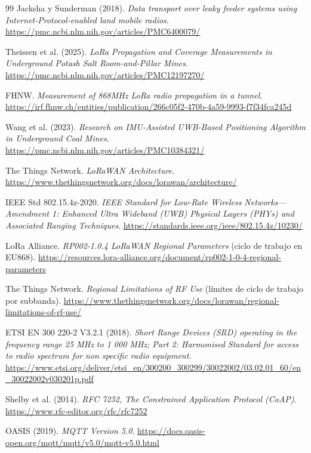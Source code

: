 \documentclass[11pt,a4paper]{article}
\begin{document}
\begin{thebibliography}{99}
     Jacksha y Sunderman (2018). \emph{Data transport over leaky feeder systems using Internet-Protocol-enabled land mobile radios}. \url{https://pmc.ncbi.nlm.nih.gov/articles/PMC6400079/}

     Theissen et al. (2025). \emph{LoRa Propagation and Coverage Measurements in Underground Potash Salt Room-and-Pillar Mines}. \url{https://pmc.ncbi.nlm.nih.gov/articles/PMC12197270/}

     FHNW. \emph{Measurement of 868MHz LoRa radio propagation in a tunnel}. \url{https://irf.fhnw.ch/entities/publication/266c05f2-470b-4a59-9993-f7f34fca245d}

     Wang et al. (2023). \emph{Research on IMU-Assisted UWB-Based Positioning Algorithm in Underground Coal Mines}. \url{https://pmc.ncbi.nlm.nih.gov/articles/PMC10384321/}

     The Things Network. \emph{LoRaWAN Architecture}. \url{https://www.thethingsnetwork.org/docs/lorawan/architecture/}

     IEEE Std 802.15.4z-2020. \emph{IEEE Standard for Low-Rate Wireless Networks---Amendment 1: Enhanced Ultra Wideband (UWB) Physical Layers (PHYs) and Associated Ranging Techniques}. \url{https://standards.ieee.org/ieee/802.15.4z/10230/}

     LoRa Alliance. \emph{RP002-1.0.4 LoRaWAN Regional Parameters} (ciclo de trabajo en EU868). \url{https://resources.lora-alliance.org/document/rp002-1-0-4-regional-parameters}

     The Things Network. \emph{Regional Limitations of RF Use} (límites de ciclo de trabajo por subbanda). \url{https://www.thethingsnetwork.org/docs/lorawan/regional-limitations-of-rf-use/}

     ETSI EN 300 220-2 V3.2.1 (2018). \emph{Short Range Devices (SRD) operating in the frequency range 25 MHz to 1 000 MHz; Part 2: Harmonised Standard for access to radio spectrum for non specific radio equipment}. \url{https://www.etsi.org/deliver/etsi_en/300200_300299/30022002/03.02.01_60/en_30022002v030201p.pdf}

     Shelby et al. (2014). \emph{RFC 7252, The Constrained Application Protocol (CoAP)}. \url{https://www.rfc-editor.org/rfc/rfc7252}

     OASIS (2019). \emph{MQTT Version 5.0}. \url{https://docs.oasis-open.org/mqtt/mqtt/v5.0/mqtt-v5.0.html}


\end{thebibliography}
\end{document}
